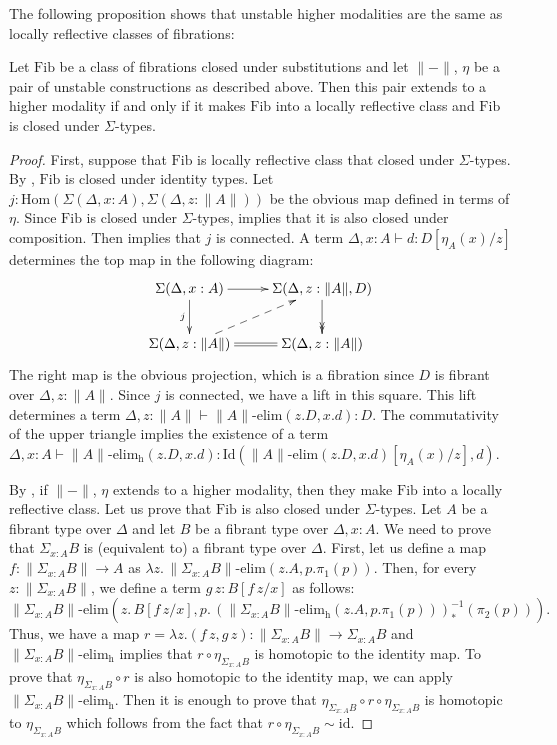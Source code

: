 \documentclass[reqno]{amsart}
\theoremstyle{definition}
\theoremstyle{remark}
\newcommand{\fs}[1]{\mathrm{#1}}
\newcommand{\Hom}{\fs{Hom}}
\newcommand{\Id}{\fs{Id}}
\newcommand{\sym}[1]{#1^{-1}}
\newcommand{\id}{\fs{id}}
\newcommand{\Fib}{\fs{Fib}}
\numberwithin{figure}{section}
\begin{document}
The following proposition shows that unstable higher modalities are the same as locally reflective classes of fibrations:

\begin{prop}
Let $\Fib$ be a class of fibrations closed under substitutions and let $\| - \|$, $\eta$ be a pair of unstable constructions as described above.
Then this pair extends to a higher modality if and only if it makes $\Fib$ into a locally reflective class and $\Fib$ is closed under $\Sigma$-types.
\end{prop}
\begin{proof}
First, suppose that $\Fib$ is locally reflective class that closed under $\Sigma$-types.
By , $\Fib$ is closed under identity types.
Let $j : \Hom(\Sigma(\Delta, x : A), \Sigma(\Delta, z : \| A \|))$ be the obvious map defined in terms of $\eta$.
Since $\Fib$ is closed under $\Sigma$-types,  implies that it is also closed under composition.
Then  implies that $j$ is connected.
A term $\Delta, x : A \vdash d : D[\eta_A(x)/z]$ determines the top map in the following diagram:
\[ \xymatrix{ \Sigma(\Delta, x : A) \ar[r] \ar[d]_j                  & \Sigma(\Delta, z : \| A \|, D) \ar@{->>}[d] \\
              \Sigma(\Delta, z : \| A \|) \ar@{-->}[ur] \ar@{=}[r]  & \Sigma(\Delta, z : \| A \|)
            } \]
The right map is the obvious projection, which is a fibration since $D$ is fibrant over $\Delta, z : \| A \|$.
Since $j$ is connected, we have a lift in this square.
This lift determines a term $\Delta, z : \| A \| \vdash \| A \|\text{-}\fs{elim}(z.D, x.d) : D$.
The commutativity of the upper triangle implies the existence of a term $\Delta, x : A \vdash \| A \|\text{-}\fs{elim_h}(z.D, x.d) : \Id(\| A \|\text{-}\fs{elim}(z.D, x.d)[\eta_A(x)/z],d)$.

By , if $\| - \|$, $\eta$ extends to a higher modality, then they make $\Fib$ into a locally reflective class.
Let us prove that $\Fib$ is also closed under $\Sigma$-types.
Let $A$ be a fibrant type over $\Delta$ and let $B$ be a fibrant type over $\Delta, x : A$.
We need to prove that $\Sigma_{x : A} B$ is (equivalent to) a fibrant type over $\Delta$.
First, let us define a map $f : \| \Sigma_{x : A} B \| \to A$ as $\lambda z.\,\| \Sigma_{x : A} B \|\text{-}\fs{elim}(z.A,p.\pi_1(p))$.
Then, for every $z : \| \Sigma_{x : A} B \|$, we define a term $g\,z : B[f\,z/x]$ as follows:
\[ \| \Sigma_{x : A} B \|\text{-}\fs{elim}(z.\,B[f\,z/x], p.\,\sym{(\| \Sigma_{x : A} B\|\text{-}\fs{elim_h}(z.A,p.\pi_1(p)))}_*(\pi_2(p))). \]
Thus, we have a map $r = \lambda z.(f\,z,g\,z) : \| \Sigma_{x : A} B \| \to \Sigma_{x : A} B$ and $\| \Sigma_{x : A} B\|\text{-}\fs{elim_h}$ implies that $r \circ \eta_{\Sigma_{x : A} B}$ is homotopic to the identity map.
To prove that $\eta_{\Sigma_{x : A} B} \circ r$ is also homotopic to the identity map, we can apply $\| \Sigma_{x : A} B\|\text{-}\fs{elim_h}$.
Then it is enough to prove that $\eta_{\Sigma_{x : A} B} \circ r \circ \eta_{\Sigma_{x : A} B}$ is homotopic to $\eta_{\Sigma_{x : A} B}$ which follows from the fact that $r \circ \eta_{\Sigma_{x : A} B} \sim \id$.
\end{proof}
\end{document}
